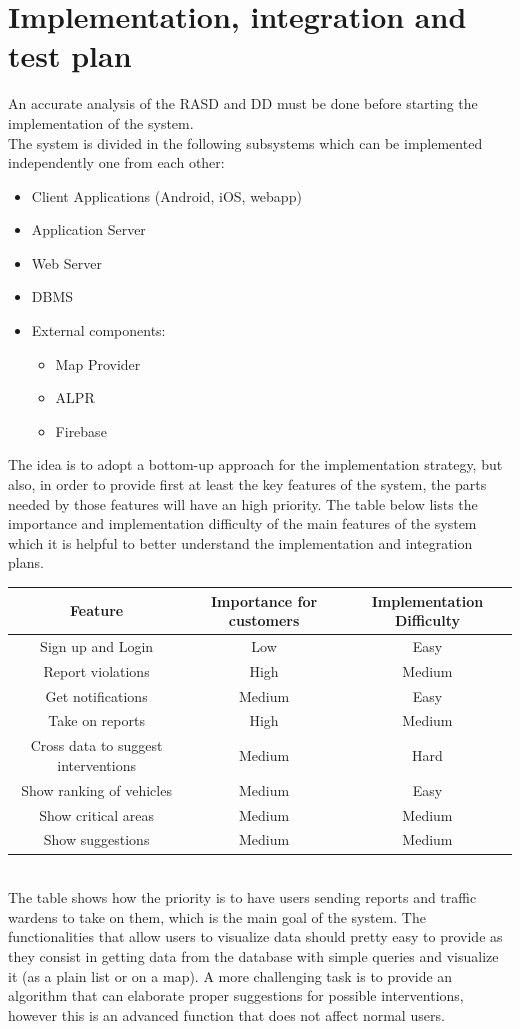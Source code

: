 \documentclass{article}
\begin{document}
\section{Implementation, integration and test plan}
\label{sec:ittp}
An accurate analysis of the RASD and DD must be done before starting the implementation of the system.\\
The system is divided in the following subsystems which can be implemented independently one from each other:
\begin{itemize}
	\item Client Applications (Android, iOS, webapp)
	\item Application Server
	\item Web Server
	\item DBMS
	\item External components:
	\begin{itemize}
		\item Map Provider
		\item ALPR
		\item Firebase
	\end{itemize}
\end{itemize}
The idea is to adopt a bottom-up approach for the implementation strategy, but also, in order to provide first at least the key features of the system, the parts needed by those features will have an high priority.
The table below lists the importance and implementation difficulty of the main features of the system which it is helpful to better understand the implementation and integration plans.
\\
\begin{tabular}{c|c|c}
\hline
\bf Feature & \bf Importance for customers & \bf Implementation Difficulty\\
\hline
\hline
Sign up and Login & Low & Easy\\
\hline
Report violations & High & Medium \\
\hline
Get notifications & Medium & Easy\\
\hline
Take on reports & High & Medium \\
\hline
Cross data to suggest interventions  & Medium & Hard\\
\hline
Show ranking of vehicles & Medium & Easy\\
\hline
Show critical areas & Medium & Medium\\
\hline
Show suggestions & Medium & Medium\\
\hline
\end{tabular}
\\
The table shows how the priority is to have users sending reports and traffic wardens to take on them, which is the  main goal of the system.
The functionalities that allow users to visualize data should pretty easy to provide as they consist in getting data from the database with simple queries and visualize it (as a plain list or on a map).
A more challenging task is to provide an algorithm that can elaborate proper suggestions for possible interventions, however this is an advanced function that does not affect normal users.
\end{document}
